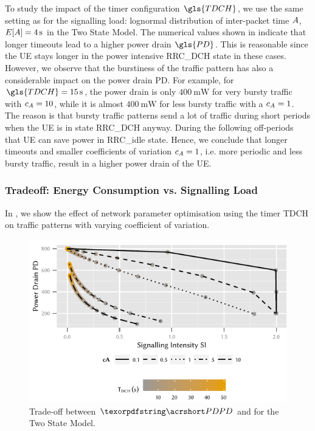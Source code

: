 To study the impact of the timer configuration \(\gls{TDCH}\), we use the same setting as for the signalling load: lognormal distribution of inter-packet time \(A\), \(E[A] = \SI{4}{\second}\) in the Two State Model.
The numerical values shown in  indicate that longer timeouts lead to a higher power drain \(\gls{PD}\).
This is reasonable since the UE stays longer in the power intensive \gls{RRC_DCH} state in these cases.
However, we observe that the burstiness of the traffic pattern has also a considerable impact on the power drain \gls{PD}. 
For example, for \(\gls{TDCH} = \SI{15}{\second}\), the power drain is only \(\SI{400}{\milli\watt}\) for very bursty traffic with \(c_{A} = 10\), while it is almost \(\SI{400}{\milli\watt}\) for less bursty traffic with a \(c_{A} = 1\). 
The reason is that bursty traffic patterns send a lot of traffic during short periods when the UE is in state \gls{RRC_DCH} anyway. During the following off-periods that \gls{UE} can save power in \gls{RRC_idle} state.
Hence, we conclude that longer timeouts and smaller coefficients of variation \(c_{A} = 1\), i.e. more periodic and less bursty traffic, result in a higher power drain of the \gls{UE}.

\subsubsection*{Tradeoff: Energy Consumption vs. Signalling Load}\label{sec:network:performance_model:trade_off}
In , we show the effect of network parameter optimisation using the timer \gls{TDCH} on traffic patterns with varying coefficient of variation.

\begin{figure}
	\centering
	\includegraphics{network/performance_model/numerical_examples/figures/2state_pd_vs_si_vs_tdch}
	\caption{Trade-off between \(\headershortacr{PD}\) and  for the Two State Model.}
	\label{fig:network:performance_model:numerical_examples:validations:analytic_vs_simulation:2state_pd_vs_si_vs_tdch}
\end{figure}

